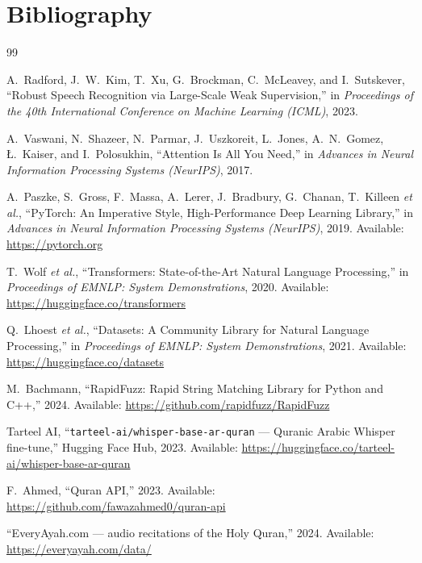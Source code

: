\documentclass[12pt,a4paper]{report}
\begin{document}
\chapter*{Bibliography}

\begin{thebibliography}{99}

A.~Radford, J.~W.~Kim, T.~Xu, G.~Brockman, C.~McLeavey, and I.~Sutskever,
``Robust Speech Recognition via Large-Scale Weak Supervision,''
in \textit{Proceedings of the 40th International Conference on Machine
Learning (ICML)}, 2023.

A.~Vaswani, N.~Shazeer, N.~Parmar, J.~Uszkoreit, L.~Jones, A.~N.~Gomez,
{\L}.~Kaiser, and I.~Polosukhin,
``Attention Is All You Need,''
in \textit{Advances in Neural Information Processing Systems (NeurIPS)},
2017.

A.~Paszke, S.~Gross, F.~Massa, A.~Lerer, J.~Bradbury, G.~Chanan,
T.~Killeen \textit{et al.},
``PyTorch: An Imperative Style, High-Performance Deep Learning Library,''
in \textit{Advances in Neural Information Processing Systems (NeurIPS)},
2019. Available: \url{https://pytorch.org}

T.~Wolf \textit{et al.},
``Transformers: State-of-the-Art Natural Language Processing,''
in \textit{Proceedings of EMNLP: System Demonstrations}, 2020.
Available: \url{https://huggingface.co/transformers}

Q.~Lhoest \textit{et al.},
``Datasets: A Community Library for Natural Language Processing,''
in \textit{Proceedings of EMNLP: System Demonstrations}, 2021.
Available: \url{https://huggingface.co/datasets}

M.~Bachmann,
``RapidFuzz: Rapid String Matching Library for Python and C++,''
2024. Available: \url{https://github.com/rapidfuzz/RapidFuzz}

Tarteel AI,
``\texttt{tarteel-ai/whisper-base-ar-quran} --- Quranic Arabic Whisper
fine-tune,'' Hugging Face Hub, 2023.
Available: \url{https://huggingface.co/tarteel-ai/whisper-base-ar-quran}

F.~Ahmed, ``Quran API,'' 2023.
Available: \url{https://github.com/fawazahmed0/quran-api}

``EveryAyah.com --- audio recitations of the Holy Quran,'' 2024.
Available: \url{https://everyayah.com/data/}


\end{thebibliography}
\end{document}
